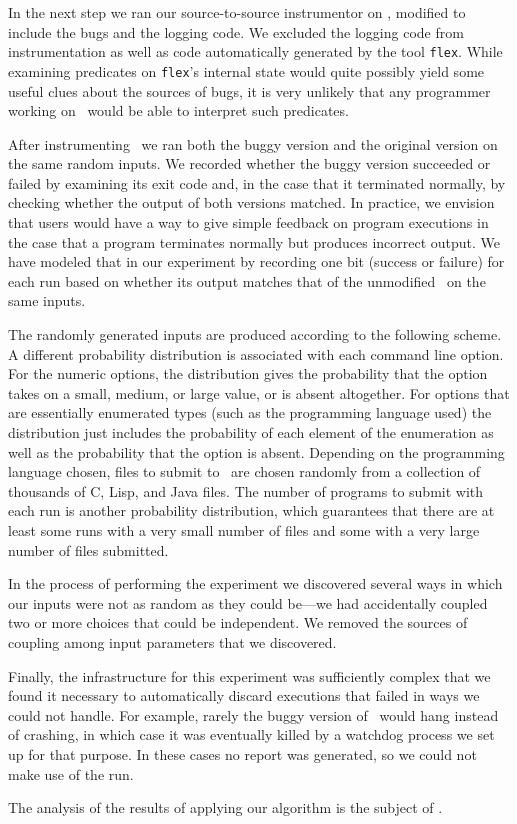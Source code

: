 In the next step we ran our source-to-source instrumentor on \moss,
modified to include the bugs and the logging code.  We excluded the logging
code from instrumentation as well as code automatically generated by the tool
{\tt flex}.  While examining predicates on {\tt flex}'s internal state
would quite possibly yield some useful clues about the sources of
bugs, it is very unlikely that any programmer working on \moss\ would
be able to interpret such predicates.

After instrumenting \moss\ we ran both the buggy version and the
original version on the same random inputs. We recorded whether the buggy
version succeeded or failed by examining its exit code and, in the
case that it terminated normally, by checking whether the output of
both versions matched.  In practice, we envision that users would have
a way to give simple feedback on program executions in the case that a
program terminates normally but produces incorrect output.  We have
modeled that in our experiment by recording one bit (success or
failure) for each run based on whether its output matches that of the
unmodified \moss\ on the same inputs.

The randomly generated inputs are produced according to the following
scheme.  A different probability distribution is associated with each
command line option.  For the numeric options, the distribution gives
the probability that the option takes on a small, medium, or large
value, or is absent altogether.  For options that are essentially
enumerated types (such as the programming language used) the
distribution just includes the probability of each element of the
enumeration as well as the probability that the option is absent.
Depending on the programming language chosen, files to submit to
\moss\ are chosen randomly from a collection of thousands of C, Lisp,
and Java files.  The number of programs to submit with each run is
another probability distribution, which guarantees that there are at
least some runs with a very small number of files and some with a very
large number of files submitted.

In the process of performing the experiment we discovered several ways
in which our inputs were not as random as they could be---we had
accidentally coupled two or more choices that could be independent.
We removed the sources of coupling among input parameters that we
discovered.

Finally, the infrastructure for this experiment was sufficiently complex
that we found it necessary to automatically discard executions that
failed in ways we could not handle.  For example, rarely the buggy version of
\moss\ would hang instead of crashing, in which case it was eventually killed
by a watchdog process we set up for that purpose.  In these cases no report
was generated, so we could not make use of the run.

The analysis of the results of applying our algorithm is the
subject of .

